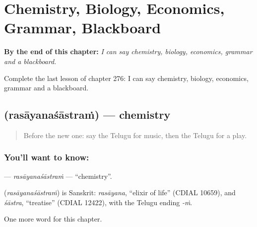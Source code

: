 
\chapter{Chemistry, Biology, Economics, Grammar, Blackboard}
\label{ch:te-chemistry-biology-economics-grammar-blackboard}

\begin{chapteropening}
\textbf{By the end of this chapter:} \emph{I can say chemistry, biology, economics, grammar and a blackboard.}

Complete the last lesson of chapter 276: I can say chemistry, biology, economics, grammar and a blackboard.
\end{chapteropening}

\section[\texorpdfstring{\te{రసాయనశాస్త్రం} (rasāyanaśāstraṁ)}{రసాయనశాస్త్రం (rasāyanaśāstraṁ)}]{ (rasāyanaśāstraṁ) — chemistry}

\label{lesson:TE-C276-rasayanasastram}



\begin{quote}
Before the new one: say the Telugu for music, then the Telugu for a play.
\end{quote}

\subsection*{You'll want to know: }
\textbf{} — \emph{rasāyanaśāstraṁ} — \textquotedblleft{}chemistry\textquotedblright{}.

\begin{cousinweb}
\textbf{} (\emph{rasāyanaśāstraṁ}) is Sanskrit: \emph{rasāyana}, \textquotedblleft{}elixir of life\textquotedblright{} (CDIAL 10659), and \emph{śāstra}, \textquotedblleft{}treatise\textquotedblright{} (CDIAL 12422), with the Telugu ending \emph{-ṁ}.
\end{cousinweb}

\begin{grammarlens}[title={What you've built}]
One more word for this chapter.
\end{grammarlens}

